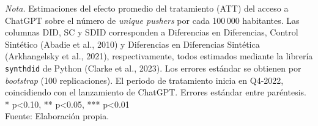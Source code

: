\begin{table}[htbp]
\begin{minipage}{\linewidth}
\smallskip\footnotesize\textit{Nota.} Estimaciones del efecto promedio del tratamiento (ATT) del acceso a ChatGPT sobre el n\'{u}mero de \textit{unique pushers} por cada 100\,000 habitantes. Las columnas DID, SC y SDID corresponden a Diferencias en Diferencias, Control Sint\'{e}tico (Abadie et al., 2010) y Diferencias en Diferencias Sint\'{e}tica (Arkhangelsky et al., 2021), respectivamente, todos estimados mediante la librer\'{i}a \texttt{synthdid} de Python (Clarke et al., 2023). Los errores est\'{a}ndar se obtienen por \textit{bootstrap} (100 replicaciones). El periodo de tratamiento inicia en Q4-2022, coincidiendo con el lanzamiento de ChatGPT. Errores est\'{a}ndar entre par\'{e}ntesis. * p<0.10, ** p<0.05, *** p<0.01\\[\baselineskip]Fuente: Elaboraci\'{o}n propia.
\end{minipage}
\end{table}
